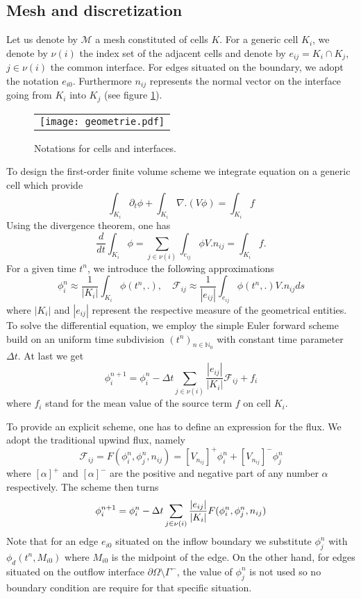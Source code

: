\subsection{Mesh and discretization}
Let us denote by $\mathcal M$ a mesh constituted of cells $K$. For a generic cell $K_i$, we denote by
$\nu(i)$ the index set of the adjacent cells and denote by $e_{ij}=K_i\cap K_j$, $j\in \nu(i)$  
the common interface. For edges situated on the boundary, we adopt the notation $e_{i0}$.
Furthermore $n_{ij}$ represents the normal vector on the interface going from $K_i$ into $K_j$
(see figure \ref{cell}). 
\begin{figure}[ht]
\begin{center}
\begin{tabular}{c}
\texttt{[image: geometrie.pdf]}
\end{tabular}
\end{center}
\caption{\label{cell} \footnotesize Notations for cells and interfaces.}
\end{figure}
To design the first-order finite volume scheme we integrate equation on a generic cell which provide
$$
\int_{K_i}\partial_t \phi+\int_{K_i}\nabla.(V\phi)=\int_{K_i} f
$$
Using the divergence theorem, one has
$$
\frac{d}{dt}\int_{K_i} \phi=\sum_{j\in\nu(i)} \int_{e_{ij}} \phi V.n_{ij}=\int_{K_i} f.
$$
For a given time $t^n$, we introduce the following approximations
$$
\phi_i^n\approx \frac{1}{|K_i|} \int_{K_i} \phi(t^n,.), \quad
\mathcal F_{ij}\approx\frac{1}{|e_{ij}|}\int_{e_{ij}}  \phi(t^n,.) V.n_{ij}ds
$$
where $|K_i|$ and $|e_{ij}|$ represent the respective measure of the geometrical entities.
To solve the differential equation, we employ the simple Euler forward scheme build on an 
uniform time subdivision $(t^n)_{n\in\mathbb N_0}$ with constant time parameter $\Delta t$.
At last we get
$$
\phi_i^{n+1}=\phi_i^{n}-\Delta t \sum_{j\in\nu(i)} \frac{|e_{ij}|}{|K_i|}\mathcal F_{ij} +f_i
$$
where $f_i$ stand for the mean value of the source term $f$ on cell $K_i$.

To provide an explicit scheme, one has to define an expression for the flux. We adopt the traditional
upwind flux, namely
$$
\mathcal F_{ij}= F(\phi_i^n, \phi_j^n, n_{ij}) = [V_{n_{ij}}]^{+}\phi_i^n + [V_{n_{ij}}]^{-}\phi_j^n 
$$
where $[\alpha]^+$ and $[\alpha]^-$ are the positive and negative part of any number $\alpha$ respectively.
The scheme then turns
$$ 
\phi_i^{n+1} = \phi_i^n - \Delta{t} \sum_{j \in \nu(i)} {|e_{ij}| \over |K_i|} F(\phi_i^n, \phi_j^n, n_{ij}) 
$$
Note that for an edge $e_{i0}$ situated on the inflow boundary we substitute 
$\phi^n_j$ with $\phi_d(t^n,M_{i0})$
where $M_{i0}$ is the midpoint of the edge. On the other hand, for edges situated on the outflow interface
$\partial \Omega \setminus \Gamma^-$, the value of $\phi^n_j$ is not used so no boundary condition
are require for that specific situation.

